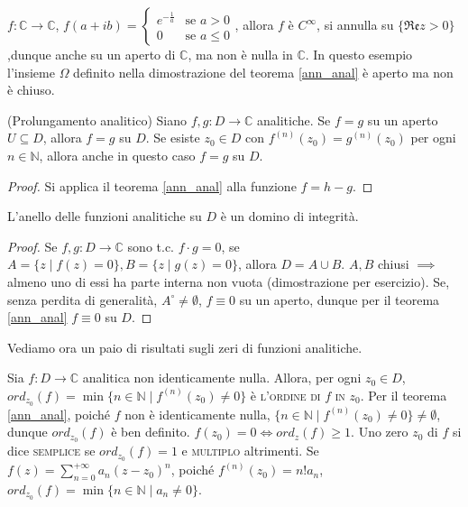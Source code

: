 \begin{ex}
  $f: \mathbb{C} \longrightarrow \mathbb{C}$, $f(a+ib)=\begin{cases} e^{-\frac{1}{a}} & \mbox{se }a>0 \\ 0 & \mbox{se }a \le 0

\end{cases}$, allora $f$ è $C^{\infty}$, si annulla su $\{\mathfrak{Re}z>0\}$,dunque anche su un aperto di $\mathbb{C}$, ma non è nulla in $\mathbb{C}$. In questo esempio l'insieme $\Omega$ definito nella dimostrazione del teorema \ref{ann_anal} è aperto ma non è chiuso.
\end{ex}

\begin{cor}
  (Prolungamento analitico) Siano $f, g:D \longrightarrow \mathbb{C}$ analitiche. Se $f=g$ su un aperto $U \subseteq D$, allora $f=g$ su $D$. Se esiste $z_0 \in D$ con $f^{(n)}(z_0)=g^{(n)}(z_0)$ per ogni $n \in \mathbb{N}$, allora anche in questo caso $f=g$ su $D$.
\end{cor}

\begin{proof}
  Si applica il teorema \ref{ann_anal} alla funzione $f=h-g$.
\end{proof}

\begin{cor}
  L'anello delle funzioni analitiche su $D$ è un domino di integrità.
\end{cor}

\begin{proof}
  Se $f, g:D \longrightarrow \mathbb{C}$ sono t.c. $f \cdot g=0$, se $A=\{z \mid f(z)=0\}, B=\{z \mid g(z)=0\}$, allora $D=A \cup B$. $A, B$ chiusi $\implies$ almeno uno di essi ha parte interna non vuota (dimostrazione per esercizio). Se, senza perdita di generalità, $A^{\circ}\not=\emptyset$, $f \equiv 0$ su un aperto, dunque per il teorema \ref{ann_anal} $f \equiv 0$ su $D$.
\end{proof}

Vediamo ora un paio di risultati sugli zeri di funzioni analitiche.

\begin{defn}
  Sia $f:D \longrightarrow \mathbb{C}$ analitica non identicamente nulla. Allora, per ogni $z_0 \in D$, $ord_{z_0}(f)=\min{\{n \in \mathbb{N} \mid f^{(n)}(z_0)\not=0\}}$ è \textsc{l'ordine di $f$ in $z_0$}.
  Per il teorema \ref{ann_anal}, poiché $f$ non è identicamente nulla, $\{n \in \mathbb{N} \mid f^{(n)}(z_0)\not=0\}\not=\emptyset$, dunque $ord_{z_0}(f)$ è ben definito. $f(z_0)=0 \iff ord_{z}(f) \ge 1$.
  Uno zero $z_0$ di $f$ si dice \textsc{semplice} se $ord_{z_0}(f)=1$ e \textsc{multiplo} altrimenti. Se $\displaystyle f(z)=\sum_{n=0}^{+\infty} a_n(z-z_0)^n$, poiché $f^{(n)}(z_0)=n!a_n$, $ord_{z_0}(f)=\min{\{n \in \mathbb{N} \mid a_n\not=0\}}$.
\end{defn}

